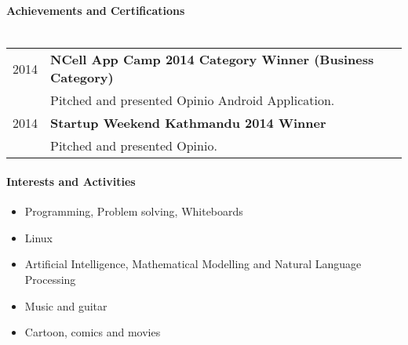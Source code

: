 \documentclass[letterpaper,10pt,oneside]{article}
\begin{document}
\paragraph{\large{Achievements and Certifications}\\\\}
\noindent \begin{tabular}{l l}
 2014    & \textbf{NCell App Camp 2014 Category Winner (Business Category)} \\
         & Pitched and presented Opinio Android Application. \\
 2014    & \textbf{Startup Weekend Kathmandu 2014 Winner} \\
         & Pitched and presented Opinio. \\
\end{tabular}

\paragraph{\large{Interests and Activities}}
\begin{itemize}
    \itemsep-0.2em 
    \item Programming, Problem solving, Whiteboards
    \item Linux
    \item Artificial Intelligence, Mathematical Modelling and Natural Language Processing
    \item Music and guitar
    \item Cartoon, comics and movies
\end{itemize}

\newpage
\end{document}
